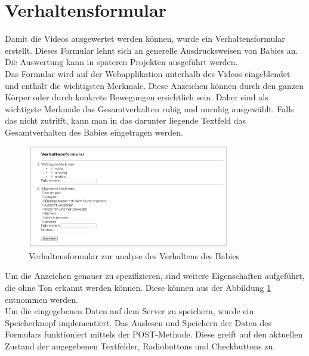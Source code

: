 \section{Verhaltensformular}
\label{sec:verhaltensformular}

Damit die Videos ausgewertet werden können, wurde ein Verhaltensformular erstellt. Dieses Formular lehnt sich an generelle Ausdrucksweisen von Babies an.
Die Auswertung kann in späteren Projekten ausgeführt werden.\\

Das Formular wird auf der Webapplikation unterhalb des Videos eingeblendet und enthält die wichtigsten Merkmale. Diese Anzeichen können durch den ganzen Körper oder durch konkrete Bewegungen ersichtlich sein. Daher sind als \dq wichtigste Merkmale \dq das Gesamtverhalten \dq ruhig \dq und \dq unruhig \dq ausgewählt. Falls das nicht zutrifft, kann man in das darunter liegende Textfeld das Gesamtverhalten des Babies eingetragen werden.

\begin{figure}[]
	\centering
		\includegraphics[width=0.8\textwidth]{includes/evalsys/graphics/verhaltensformular}
	\caption{Verhaltensformular zur analyse des Verhaltens des Babies}
	\label{fig:verhaltensformular}
\end{figure}

Um die Anzeichen genauer zu spezifizieren, sind weitere Eigenschaften aufgeführt, die ohne Ton erkannt werden können. Diese können aus der Abbildung \ref{fig:verhaltensformular} entnommen werden.\\
Um die eingegebenen Daten auf dem Server zu speichern, wurde ein Speicherknopf implementiert. Das Auslesen und Speichern der Daten des Formulars funktioniert mittels der POST-Methode. Diese greift auf den aktuellen Zustand der angegebenen Textfelder, Radiobuttons und Checkbuttons zu.

